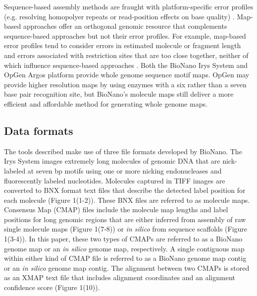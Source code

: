 \documentclass{bmcart}
\begin{document}


Sequence-based assembly methods are fraught with platform-specific error profiles (e.g. resolving homopolyer repeats or read-position effects on base quality) \cite{SeqBias2013}. Map-based approaches offer an orthogonal genomic resource that complements sequence-based approaches but not their error profiles. For example, map-based error profiles tend to consider errors in estimated molecule or fragment length and errors associated with restriction sites that are too close together, neither of which influence sequence-based approaches \cite{OpGenAnalysis2014,BioNanoSV2014}. Both the BioNano Irys System and OpGen Argos platform provide whole genome sequence motif maps. OpGen may provide higher resolution maps by using enzymes with a six rather than a seven base pair recognition site, but BioNano's molecule maps still deliver a more efficient and affordable method for generating whole genome maps. 

\subsection*{Data formats}
The tools described make use of three file formats developed by BioNano. The Irys System images extremely long molecules of genomic DNA that are nick-labeled at seven bp motifs using one or more nicking endonucleases and fluorescently labeled nucleotides. Molecules captured in TIFF images are converted to BNX format text files that describe the detected label position for each molecule (Figure 1(1-2)). These BNX files are referred to as molecule maps. Consensus Map (CMAP) files include the molecule map lengths and label positions for long genomic regions that are either inferred from assembly of raw single molecule maps (Figure 1(7-8)) or \textit{in silico} from sequence scaffolds (Figure 1(3-4)). In this paper, these two types of CMAPs are referred to as a BioNano genome map or an \textit{in silico} genome map, respectively. A single contiguous map within either kind of CMAP file is referred to as a BioNano genome map contig or an \textit{in silico} genome map contig. The alignment between two CMAPs is stored as an XMAP text file that includes alignment coordinates and an alignment confidence score (Figure 1(10)).
\end{document}
